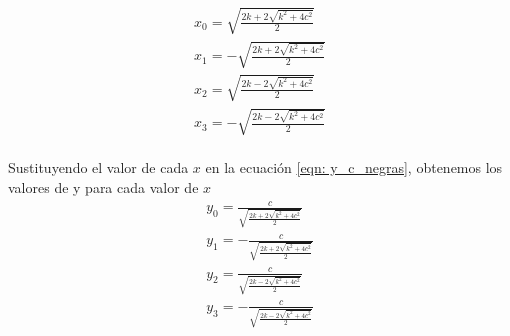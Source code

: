 \documentclass[12pt]{article}
\begin{document}
\begin{align*}
  x_0=\sqrt{\frac{2k+2\sqrt{k^2+4c^2}}{2}}\\
  x_1=-\sqrt{\frac{2k+2\sqrt{k^2+4c^2}}{2}}\\
  x_2=\sqrt{\frac{2k-2\sqrt{k^2+4c^2}}{2}}\\
  x_3=-\sqrt{\frac{2k-2\sqrt{k^2+4c^2}}{2}}\\
\end{align*}

Sustituyendo el valor de cada $x$ en la ecuación \eqref{eqn: y_c_negras}, obtenemos los valores de y para cada valor de $x$
\begin{align*}
  y_0=\frac{c}{\sqrt{\frac{2k+2\sqrt{k^2+4c^2}}{2}}}\\
  y_1=-\frac{c}{\sqrt{\frac{2k+2\sqrt{k^2+4c^2}}{2}}}\\
  y_2=\frac{c}{\sqrt{\frac{2k-2\sqrt{k^2+4c^2}}{2}}}\\
  y_3=-\frac{c}{\sqrt{\frac{2k-2\sqrt{k^2+4c^2}}{2}}}\\
\end{align*}
\end{document}

